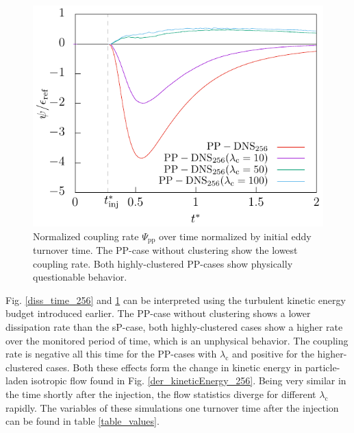 \documentclass[11pt,a4paper,openany,oneside,parskip=half*]{article}
\begin{document}
\begin{figure}[h]
\begin{minipage}[t]{0.5\textwidth}
        \includegraphics[width=\linewidth]{./Abbildungen/256/coupling_time.pdf}
        \caption{Normalized coupling rate $\Psi_\mathrm{pp}$ over time normalized by initial eddy turnover time. The PP-case without clustering show the lowest coupling rate. Both highly-clustered PP-cases show physically questionable behavior.}
        \label{coupling_time_256}
    \end{minipage}
\end{figure}
\newline
Fig. \ref{diss_time_256} and \ref{coupling_time_256} can be interpreted using the turbulent kinetic energy budget introduced earlier. The PP-case without clustering shows a lower dissipation rate than the sP-case, both highly-clustered cases show a higher rate over the monitored period of time, which is an unphysical behavior. The coupling rate is negative all this time for the PP-cases with $\lambda_\mathrm{c}$ and positive for the higher-clustered cases. Both these effects form the change in kinetic energy in particle-laden isotropic flow found in Fig. \ref{der_kineticEnergy_256}.
\newline
Being very similar in the time shortly after the injection, the flow statistics diverge for different $\lambda_\mathrm{c}$ rapidly. The variables of these simulations one turnover time after the injection can be found in table \ref{table_values}. 
\end{document}
